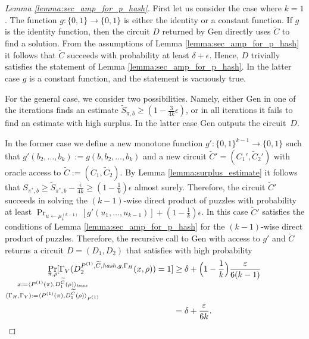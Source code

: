 %
%
\begin{proof}[Lemma \ref{lemma:sec_amp_for_p_hash}]
First let us consider the case where $k=1$. The function $g: \{0,1\} \rightarrow \{0,1\}$ is either the identity or a constant function.
If $g$ is the identity function, then the circuit $D$ returned by Gen directly uses $\widetilde{C}$ to find a solution.
From the assumptions of Lemma \ref{lemma:sec_amp_for_p_hash} it follows that $\widetilde{C}$ succeeds with probability at least
$\delta + \epsilon$. Hence, $D$ trivially satisfies the statement of Lemma \ref{lemma:sec_amp_for_p_hash}.
In the latter case $g$ is a constant function, and the statement is vacuously true.

For the general case, we consider two possibilities.
Namely, either Gen in one of the iterations finds an estimate $\widetilde{S}_{\pi, b} \geq (1-\frac{3}{4k}\epsilon)$,
or in all iterations it fails to find an estimate with high surplus. In the latter case Gen outputs the circuit~$D$.

In the former case we define a new monotone function $g': \{0,1\}^{k-1} \rightarrow \{0,1\}$ such that $g'(b_2, \dots, b_k) := g(b, b_2, \dots, b_k)$
and a new circuit $\widetilde{C}' = (C_1', \widetilde{C}_2')$ with oracle access to $\widetilde{C} := (C_1, \widetilde{C}_2)$.
By Lemma \ref{lemma:surplus_estimate} it follows that $S_{\pi^*,b} \geq \widetilde{S}_{\pi^*, b} - \frac{\epsilon}{4k} \geq (1 - \frac{1}{k})\epsilon$ almost surely.
Therefore, the circuit $\widetilde{C}'$ succeeds in solving the $(k-1)$-wise direct product of puzzles with probability
at least $\Pr_{u \leftarrow \mu^{(k-1)}_{\delta}}[g'(u_1,\dots, u_{k-1} )] + (1 - \frac{1}{k})\epsilon$.
In this case $\widetilde{C}'$ satisfies the conditions of Lemma \ref{lemma:sec_amp_for_p_hash}
for the $(k-1)$-wise direct product of puzzles. Therefore,
the recursive call to Gen with access to $g'$ and $\widetilde{C}$ returns a circuit $D = (D_1, D_2)$
that satisfies with high probability
\begin{align}
  \underset{
    \mathclap{
      \substack{
        \pi, \rho \\
        x := \langle P^{(1)}(\pi), D_1^{\widetilde{C}}(\rho) \rangle_{\mathit{trans}} \\
        (\Gamma_H, \Gamma_V) := \langle P^{(1)}(\pi), D_1^{\widetilde{C}}(\rho) \rangle_{P^{(1)}}}}}
  {\Pr}[\Gamma_V(D_2^{P^{(1)}, \widetilde{C}, \hash, g, \Gamma_H}(x, \rho)) = 1]
  &\geq \delta + \Bigl(1 - \frac{1}{k}\Bigr)\frac{\epsilon}{6(k-1)} \notag\\
  &= \delta + \frac{\epsilon}{6k}.
\end{align}
%


\end{proof}
